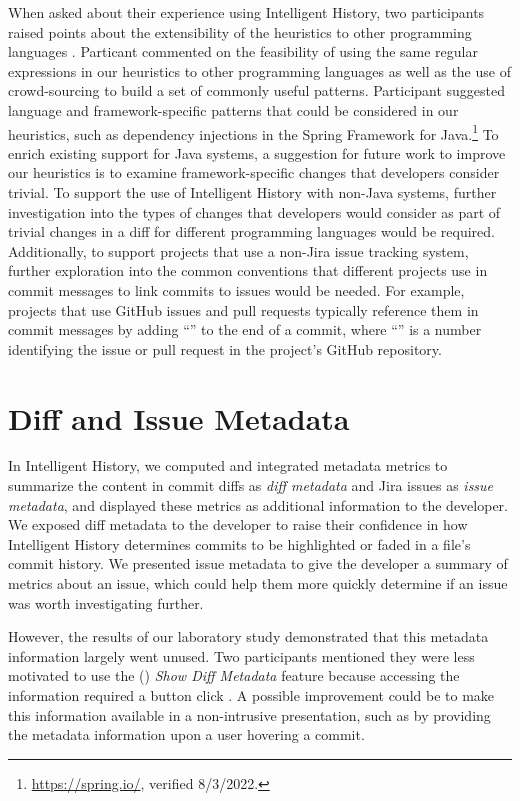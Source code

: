 When asked about their experience using Intelligent History, 
two participants raised points about the extensibility of the heuristics to other programming languages .
Particant  commented on the feasibility of using the same regular expressions in our heuristics 
to other programming languages as well as the use of crowd-sourcing to build a set of commonly useful patterns.
Participant  suggested language and framework-specific patterns that could
be considered in our heuristics, such as dependency injections in the Spring Framework for Java.\footnote{\url{https://spring.io/}, verified 8/3/2022.}
To enrich existing support for Java systems, a suggestion for future work
to improve our heuristics is to examine framework-specific changes that developers consider
trivial. To support the use of Intelligent History with non-Java systems,
further investigation into the types of changes that developers would consider as part of trivial changes
in a diff for different programming languages would be required. 
Additionally, to support projects that use a non-Jira issue tracking system,
further exploration into the common conventions that different projects use in commit messages
to link commits to issues would be needed.
For example, projects that use GitHub issues and pull requests typically
reference them in commit messages by adding ``'' to the end of a commit,
where ``'' is a number identifying the issue or pull request in the project's GitHub repository.


\section{Diff and Issue Metadata}

In Intelligent History, we computed and integrated metadata metrics to summarize 
the content in commit diffs as \emph{diff metadata} and Jira issues as \emph{issue metadata}, 
and  displayed these metrics as additional information to the developer.
We exposed diff metadata to the developer to raise their confidence in how Intelligent History
determines commits to be highlighted or faded in a file's commit history.
We presented issue metadata to give the developer a summary of metrics about
an issue, which could help them more quickly determine if an issue was worth investigating further.

However, the results of our laboratory study demonstrated that this metadata information largely went unused.
Two participants mentioned they were less motivated to use the () \textit{Show Diff Metadata} feature
because accessing the information required a button click .
A possible improvement could be to make this information available in a non-intrusive presentation,
such as by providing the metadata information upon a user hovering  a commit.

